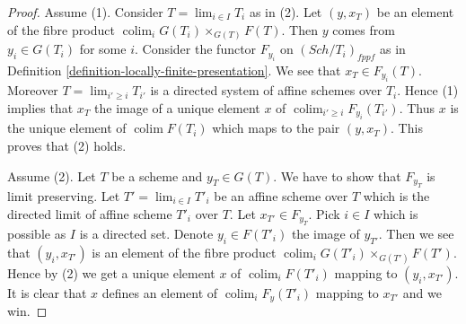 \documentclass{stacks-project}
\theoremstyle{plain}
\theoremstyle{definition}
\theoremstyle{remark}
\numberwithin{equation}{subsection}
\def\lim{\mathop{\mathrm{lim}}\nolimits}
\def\colim{\mathop{\mathrm{colim}}\nolimits}
\def\Sch{\mathit{Sch}}
\begin{document}
\begin{proof}
Assume (1). Consider $T = \lim_{i \in I} T_i$ as in (2). Let
$(y, x_T)$ be an element of the fibre product
$\colim_i G(T_i) \times_{G(T)} F(T)$.
Then $y$ comes from $y_i \in G(T_i)$ for some $i$.
Consider the functor $F_{y_i}$ on $(\Sch/T_i)_{fppf}$ as in
Definition \ref{definition-locally-finite-presentation}.
We see that $x_T \in F_{y_i}(T)$. Moreover $T = \lim_{i' \geq i} T_{i'}$
is a directed system of affine schemes over $T_i$. Hence (1) implies
that $x_T$ the image of a unique element $x$ of
$\colim_{i' \geq i} F_{y_i}(T_{i'})$. Thus $x$ is the unique
element of $\colim F(T_i)$ which maps to the pair $(y, x_T)$.
This proves that (2) holds.

\medskip\noindent
Assume (2). Let $T$ be a scheme and $y_T \in G(T)$. We have to show that
$F_{y_T}$ is limit preserving. Let $T' = \lim_{i \in I} T'_i$ be an
affine scheme over $T$ which is the directed limit of affine scheme $T'_i$
over $T$. Let $x_{T'} \in F_{y_T}$. Pick $i \in I$ which is possible as
$I$ is a directed set. Denote $y_i \in F(T'_i)$ the
image of $y_{T'}$. Then we see that $(y_i, x_{T'})$ is an
element of the fibre product
$\colim_i G(T'_i) \times_{G(T')} F(T')$.
Hence by (2) we get a unique element $x$ of $\colim_i F(T'_i)$
mapping to $(y_i, x_{T'})$. It is clear that $x$ defines an element
of $\colim_i F_y(T'_i)$ mapping to $x_{T'}$ and we win.
\end{proof}
\end{document}
